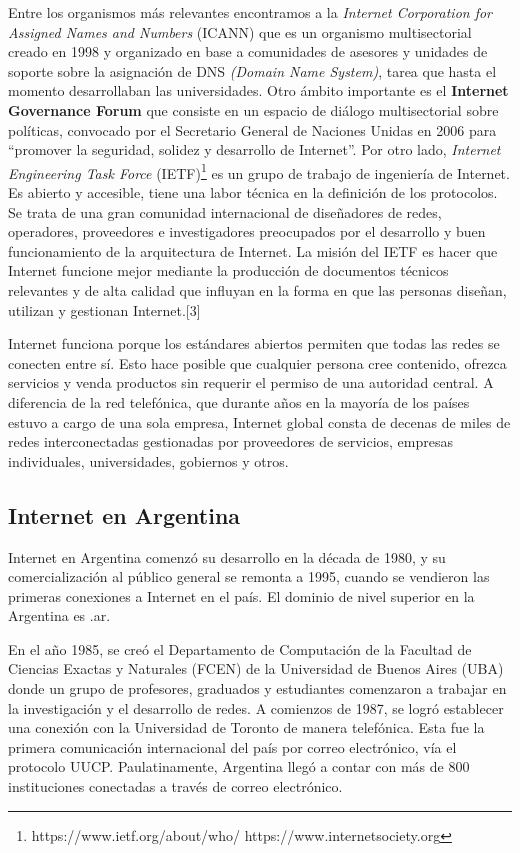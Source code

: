\documentclass[12pt]{report} %
\begin{document}
Entre los organismos más relevantes encontramos a la \textit{Internet Corporation for Assigned Names and Numbers} (ICANN) que es un organismo multisectorial creado en 1998 y organizado en base a comunidades de asesores y unidades de soporte sobre la asignación de DNS \textit{(Domain Name System)}, tarea que hasta el momento desarrollaban las universidades. Otro ámbito importante es el \textbf{Internet Governance Forum}  que consiste en un espacio de diálogo multisectorial sobre políticas, convocado por el Secretario General de Naciones Unidas en 2006 para “promover la seguridad, solidez y desarrollo de Internet”. Por otro lado, \textit{Internet Engineering Task Force}  (IETF)\footnote{https://www.ietf.org/about/who/
https://www.internetsociety.org
}  es un grupo de trabajo de ingeniería de Internet. Es abierto y accesible, tiene una labor técnica en la definición de los protocolos. Se trata de una gran comunidad internacional de diseñadores de redes, operadores, proveedores e investigadores preocupados por el desarrollo y buen funcionamiento de la arquitectura de Internet. La misión del IETF es hacer que Internet funcione mejor mediante la producción de documentos técnicos relevantes y de alta calidad que influyan en la forma en que las personas diseñan, utilizan y gestionan Internet.[3]

Internet funciona porque los estándares abiertos permiten que todas las redes se conecten entre sí. Esto hace posible que cualquier persona cree contenido, ofrezca servicios y venda productos sin requerir el permiso de una autoridad central. A diferencia de la red telefónica, que durante años en la mayoría de los países estuvo a cargo de una sola empresa, Internet global consta de decenas de miles de redes interconectadas gestionadas por proveedores de servicios, empresas individuales, universidades, gobiernos y otros.

\subsection{Internet en Argentina}

Internet en Argentina comenzó su desarrollo en la década de 1980, y su comercialización al público general se remonta a 1995, cuando se vendieron las primeras conexiones a Internet en el país. El dominio de nivel superior en la Argentina es .ar.

En el año 1985, se creó el Departamento de Computación de la Facultad de Ciencias Exactas y Naturales (FCEN) de la Universidad de Buenos Aires (UBA) donde un grupo de profesores, graduados y estudiantes comenzaron a trabajar en la investigación y el desarrollo de redes.  A comienzos de 1987, se logró establecer una conexión con la Universidad de Toronto de manera telefónica. Esta fue la primera comunicación internacional del país por correo electrónico, vía el protocolo UUCP. Paulatinamente, Argentina llegó a contar con más de 800 instituciones conectadas a través de correo electrónico.
\end{document}
